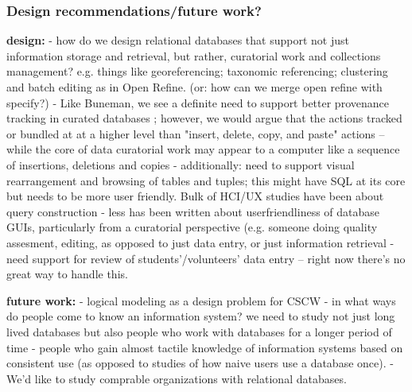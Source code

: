 \subsubsection{Design recommendations/future work?}

\textbf{design: }
- how do we design relational databases that support not just information storage and retrieval, but rather,  curatorial work and collections management? e.g. things like georeferencing; taxonomic referencing; clustering and batch editing as in Open Refine. (or: how can we merge open refine with specify?)
- Like Buneman, we see a definite need to support better provenance tracking in curated databases \cite{Buneman_2006}; however, we would argue that the actions tracked or bundled at at a higher level than "insert, delete, copy, and paste" actions -- while the core of data curatorial work may appear to a computer like a sequence of insertions, deletions and copies
- additionally: need to support visual rearrangement and browsing of tables and tuples; this might have SQL at its core but needs to be more user friendly. Bulk of HCI/UX studies have been about query construction - less has been written about userfriendliness of database GUIs, particularly from a curatorial perspective (e.g. someone doing quality assesment, editing, as opposed to just data entry, or just information retrieval
- need support for review of students'/volunteers' data entry  -- right now there's no great way to handle this.

\textbf{future work:}
- logical modeling as a design problem for CSCW
- in what ways do people come to know an information system? we need to study not just long lived databases but also people who work with databases for a longer period of time - people who gain almost tactile knowledge of information systems based on consistent use (as opposed to studies of how naive users use a database once).
- We'd like to study comprable organizations with relational databases.